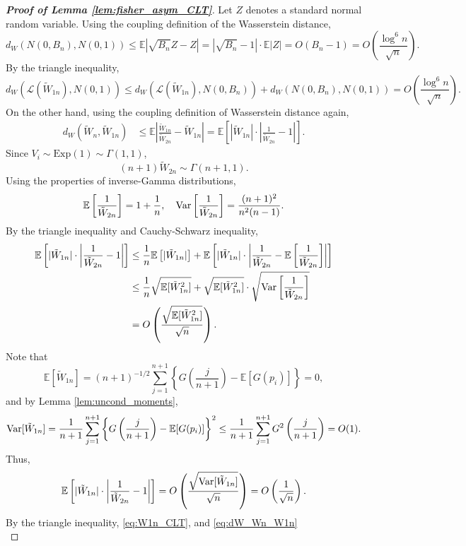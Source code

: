 \documentclass[11pt]{article}
\newcommand{\Var}{\textnormal{Var}}
\def\E{\mathbb{E}}
\newcommand{\lb}{\left(}
\newcommand{\rb}{\right)}
\begin{document}
\begin{proof}[\textbf{Proof of Lemma \ref{lem:fisher_asym_CLT}}]
Let $Z$ denotes a standard normal random variable. Using the coupling definition of the Wasserstein distance,
\[d_{W}(N(0, B_n), N(0, 1)) \le \E |\sqrt{B_n} Z - Z| = |\sqrt{B_n} - 1|\cdot \E|Z| = O(B_n - 1) = O\lb\frac{\log^6 n}{\sqrt{n}}\rb.\]
By the triangle inequality,
\begin{equation}
  \label{eq:W1n_CLT}
  d_{W}\left(\mathcal{L}(\tilde{W}_{1n}), N(0, 1)\right) \le d_{W}\left(\mathcal{L}(\tilde{W}_{1n}), N(0, B_n)\right) + d_{W}\left(N(0, B_n), N(0, 1)\right) = O\lb\frac{\log^6 n}{\sqrt{n}}\rb.
\end{equation}
On the other hand, using the coupling definition of Wasserstein distance again,
\begin{align}
  d_{W}\left(\tilde{W}_{n}, \tilde{W}_{1n}\right)&\le \E\left|\frac{\tilde{W}_{1n}}{\tilde{W}_{2n}} - \tilde{W}_{1n}\right| = \E\left[|\tilde{W}_{1n}|\cdot \left|\frac{1}{\tilde{W}_{2n}} - 1\right|\right].\label{eq:dW_Wn_W1n}
\end{align}
Since $V_i\sim \mathrm{Exp}(1)\sim \Gamma(1, 1)$,
\[(n+1)\tilde{W}_{2n}\sim \Gamma(n+1, 1).\]
Using the properties of inverse-Gamma distributions,
\[\E\left[\frac{1}{\tilde{W}_{2n}}\right] = 1 + \frac{1}{n}, \quad \Var\left[\frac{1}{\tilde{W}_{2n}}\right] = \frac{(n + 1)^2}{n^2 (n - 1)}.\]
By the triangle inequality and Cauchy-Schwarz inequality,
\begin{align*}
  \E\left[|\tilde{W}_{1n}|\cdot \left|\frac{1}{\tilde{W}_{2n}} - 1\right|\right]
  & \le \frac{1}{n}\E\left[|\tilde{W}_{1n}|\right] + \E\left[|\tilde{W}_{1n}| \cdot \left|\frac{1}{\tilde{W}_{2n}} - \E\left[\frac{1}{\tilde{W}_{2n}}\right]\right|\right]\\
  & \le \frac{1}{n}\sqrt{\E[\tilde{W}_{1n}^2]} + \sqrt{\E[\tilde{W}_{1n}^2]}\cdot \sqrt{\Var \left[\frac{1}{\tilde{W}_{2n}}\right]}\\
  & = O\lb \frac{\sqrt{\E[\tilde{W}_{1n}^2]}}{\sqrt{n}}\rb.
\end{align*}
Note that
\[\E[\tilde{W}_{1n}] = (n + 1)^{-1/2}\sum_{j=1}^{n+1}\left\{G\left(\frac{j}{n+1}\right) - \E[G(p_i)]\right\} = 0,\]
and by Lemma \ref{lem:uncond_moments}, 
\[\Var[\tilde{W}_{1n}] = \frac{1}{n+1}\sum_{j=1}^{n+1}\left\{G\left(\frac{j}{n+1}\right) - \E[G(p_i)]\right\}^2\le \frac{1}{n+1}\sum_{j=1}^{n+1}G^2\left(\frac{j}{n+1}\right) = O(1).\]
Thus,
\[\E\left[|\tilde{W}_{1n}|\cdot \left|\frac{1}{\tilde{W}_{2n}} - 1\right|\right] = O\lb \frac{\sqrt{\Var[\tilde{W}_{1n}]}}{\sqrt{n}}\rb = O\lb\frac{1}{\sqrt{n}}\rb.\]
By the triangle inequality, \eqref{eq:W1n_CLT}, and \eqref{eq:dW_Wn_W1n}
\begin{equation}

\end{equation}
\end{proof}
\end{document}
